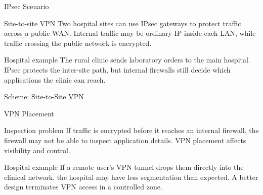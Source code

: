 \documentclass[presentation]{beamer}
\begin{document}
\begin{frame}[c]{IPsec Scenario}
\begin{block}{Site-to-site VPN}
Two hospital sites can use IPsec gateways to protect traffic across a public WAN. Internal traffic
may be ordinary IP inside each LAN, while traffic crossing the public network is encrypted.
\end{block}

\begin{exampleblock}{Hospital example}
The rural clinic sends laboratory orders to the main hospital. IPsec protects the inter-site path,
but internal firewalls still decide which applications the clinic can reach.
\end{exampleblock}
\end{frame}

\begin{frame}[c]{Scheme: Site-to-Site VPN}
\begin{center}
\end{center}
\end{frame}

\begin{frame}[c]{VPN Placement}
\begin{block}{Inspection problem}
If traffic is encrypted before it reaches an internal firewall, the firewall may not be able to
inspect application details. VPN placement affects visibility and control.
\end{block}

\begin{exampleblock}{Hospital example}
If a remote user's VPN tunnel drops them directly into the clinical network, the hospital may have
less segmentation than expected. A better design terminates VPN access in a controlled zone.
\end{exampleblock}
\end{frame}
\end{document}
